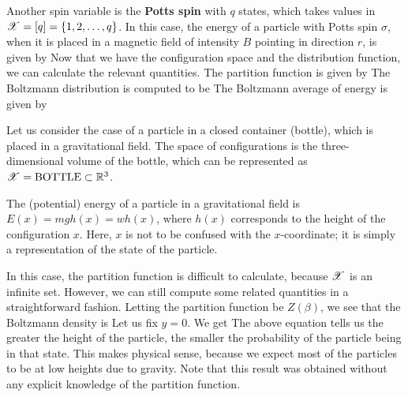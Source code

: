 \documentclass[letterpaper,english,10pt]{article}
\begin{document}
\begin{shaded*} 
\begin{exmp}
Another spin variable is the \textbf{Potts spin} with $q$ states, 
which takes values in $\mathscr{X}= [q] = \{1,2,\ldots,q\}$. 
In this case, the energy of a particle with Potts spin $\sigma$, 
when it is placed in a magnetic field of intensity $B$ pointing in direction $r$, 
is given by 
Now that we have the configuration space and the distribution function, we can calculate the relevant quantities. 
The partition function is given by 
The Boltzmann distribution is computed to be 
The Boltzmann average of energy is given by 
\end{exmp}
\end{shaded*}
\begin{shaded*} 
\begin{exmp}
Let us consider the case of a particle in a closed container (bottle), which is placed in a gravitational field. 
The space of configurations is the three-dimensional volume of the bottle, which can be represented as $\mathscr{X}=\text{BOTTLE}\subset \mathbb{R}^3$. 

The (potential) energy of a particle in a gravitational field is $E(x)=mg h(x)=w h(x)$, where $h(x)$ corresponds to the height of the configuration $x$. 
Here, $x$ is not to be confused with the $x$-coordinate; it is simply a representation of the state of the particle. 

In this case, the partition function is difficult to calculate, because $\mathscr{X}$ is an infinite set. 
However, we can still compute some related quantities in a straightforward fashion. 
Letting the partition function be $Z(\beta)$, we see that the Boltzmann density is 
Let us fix $y=0$. 
We get 
The above equation tells us the greater the height of the particle, the smaller the probability of the particle being in that state. 
This makes physical sense, because we expect most of the particles to be at low heights due to gravity. 
Note that this result was obtained without any explicit knowledge of the partition function. 
\end{exmp}
\end{shaded*}
\end{document}
